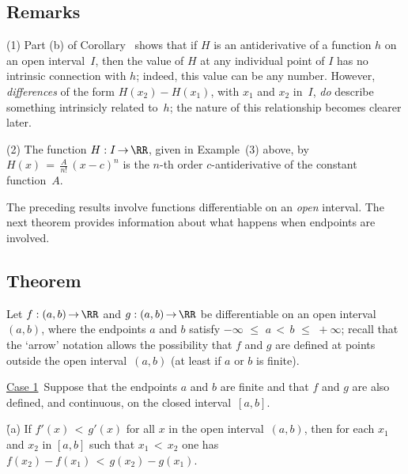{\VV

            \subsection{\small{\bf Remarks}}
            \label{RemrkE40.65C}

\V

\hspace*{\parindent}(1) Part (b) of Corollary~ shows that if $H$ is an antiderivative of a function $h$ on an open interval~$I$,
    then the value of $H$ at any individual point of $I$ has no intrinsic connection with $h$; indeed, this value can be any number.
    However, {\em differences} of the form $H(x_{2}) - H(x_{1})$, with $x_{1}$ and $x_{2}$ in~$I$,
    {\em do} describe something intrinsicly related to~$h$; the nature of this relationship becomes clearer later.

\V

        (2) The function $H:I \,{\rightarrow}\, {\RR}$, given in Example~(3) above,
    by ${\displaystyle H(x) \,=\, \frac{A}{n!}\,(x-c)^{n}}$ is the $n$-th order $c$-antiderivative of the constant function~$A$.
} %

\VV

        The preceding results involve functions differentiable on an {\em open} interval.
    The next theorem provides information about what happens when endpoints are involved.

\V

            \subsection{\small{\bf Theorem}}
            \label{ThmE40.66}

\V

        Let $f:(a,b) \,{\rightarrow}\, {\RR}$ and $g:(a,b) \,{\rightarrow}\, {\RR}$ be differentiable on an open interval $(a,b)$,
    where the endpoints $a$ and $b$ satisfy $-{\infty}\,\,{\leq}\,\,a\,<\,b\,\,{\leq}\,\,+{\infty}$;
    recall that the `arrow' notation allows the possibility that $f$ and $g$ are defined at points outside
    the open interval~$(a,b)$ (at least if $a$ or $b$ is finite).

\V

        \underline{Case 1}\, Suppose that the endpoints $a$ and $b$ are finite and that $f$ and $g$ are also defined, and continuous, on the closed interval~$[a,b]$.

        \h (a) If $f'(x)\,<\,g'(x)$ for all $x$ in the open interval~$(a,b)$, then for each $x_{1}$ and $x_{2}$ in $[a,b]$
    such that $x_{1}\,<\,x_{2}$ one has $f(x_{2}) - f(x_{1})\,<\,g(x_{2}) - g(x_{1})$.

